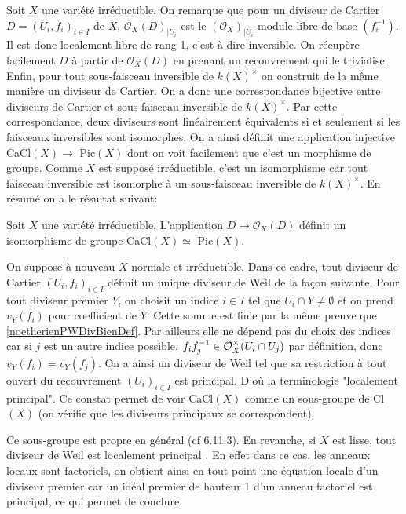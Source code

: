 Soit $X$ une variété irréductible. On remarque que pour un diviseur de Cartier $D=(U_i, f_i)_{i\in I}$ de $X$, $\mathcal{O}_X(D)_{|U_i}$ est le $(\mathcal{O}_X)_{|U_i}$-module libre de base $(f_i^{-1})$. Il est donc localement libre de rang 1, c'est à dire inversible. On récupère facilement $D$ à partir de $\mathcal{O}_X(D)$ en prenant un recouvrement qui le trivialise. Enfin, pour tout sous-faisceau inversible de $k(X)^\times$ on construit de la même manière un diviseur de Cartier. On a donc une correspondance bijective entre diviseurs de Cartier et sous-faisceau inversible de $k(X)^\times$. Par cette correspondance, deux diviseurs sont linéairement équivalents si et seulement si les faisceaux inversibles sont isomorphes. On a ainsi définit une application injective CaCl$(X)\rightarrow$ Pic$(X)$ dont on voit facilement que c'est un morphisme de groupe. Comme $X$ est supposé irréductible, c'est un isomorphisme car tout faisceau inversible est isomorphe à un sous-faisceau inversible de $k(X)^\times$. En résumé on a le résultat suivant:


\begin{prop}\label{isopic}
Soit $X$ une variété irréductible. L'application $D\mapsto \mathcal{O}_X(D)$ définit un isomorphisme de groupe CaCl$(X)\simeq $ Pic$(X)$.
\end{prop}


On suppose à nouveau $X$ normale et irréductible. Dans ce cadre, tout diviseur de Cartier $(U_i, f_i)_{i\in I}$ définit un unique diviseur de Weil de la façon suivante. Pour tout diviseur premier $Y$, on choisit un indice $i\in I$ tel que $U_i\cap Y\neq \emptyset$ et on prend $v_Y(f_i)$ pour coefficient de $Y$. Cette somme est finie par la même preuve que \ref{noetherienPWDivBienDef}. Par ailleurs elle ne dépend pas du choix des indices car si $j$ est un autre indice possible, $f_if_j^{-1}\in \mathcal{O}_X^\times(U_i\cap U_j)$ par définition, donc $v_Y(f_i)=v_Y(f_j)$. On a ainsi un diviseur de Weil tel que sa restriction à tout ouvert du recouvrement $(U_i)_{i\in I}$ est principal. D'où la terminologie "localement principal". Ce constat permet de voir CaCl$(X)$ comme un sous-groupe de Cl$(X)$ (on vérifie que les diviseurs principaux se correspondent).

Ce sous-groupe est propre en général (cf \cite{Hartshorne} 6.11.3). En revanche, si $X$ est lisse, tout diviseur de Weil est localement principal . En effet dans ce cas, les anneaux locaux sont factoriels, on obtient ainsi en tout point une équation locale d'un diviseur premier car un idéal premier de hauteur 1 d'un anneau factoriel est principal, ce qui permet de conclure.

